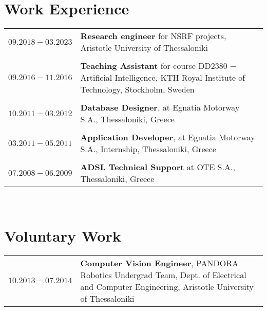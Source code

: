 \documentclass[a4paper,10pt,twoside]{article}
\begin{document}

\section{Work Experience}

\begin{tabular}{rp{12cm}}
$09.2018 - 03.2023$ & \textbf{Research engineer} for NSRF projects, Aristotle University of Thessaloniki\\
&\\
$09.2016 - 11.2016$ & \textbf{Teaching Assistant} for course DD2380 $-$ Artificial Intelligence, KTH Royal Institute of Technology, Stockholm, Sweden\\
&\\
$10.2011 - 03.2012$ & \textbf{Database Designer}, at Egnatia Motorway S.A., Thessaloniki, Greece \\
&\\
$03.2011 - 05.2011$ & \textbf{Application Developer}, at Egnatia Motorway S.A., Internship, Thessaloniki, Greece\\
&\\
$07.2008 - 06.2009$ & \textbf{ADSL Technical Support} at OTE S.A., Thessaloniki, Greece\\
\end{tabular} \\



\section{Voluntary Work}

\begin{tabular}{rp{12cm}}
$10.2013 - 07.2014$ & \textbf{Computer Vision Engineer}, PANDORA Robotics Undergrad Team,
Dept. of Electrical and Computer Engineering, Aristotle University of Thessaloniki \\
\end{tabular} \\
\end{document}
